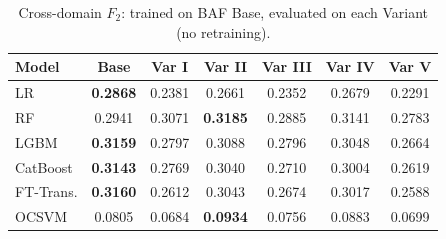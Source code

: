 \begin{table}[ht!]
\centering
\caption{Cross-domain $F_2$: trained on BAF Base, evaluated on each Variant (no retraining).}
\label{tab:crossdomain_f2}
\begin{tabular}{l c c c c c c}
\toprule
Model & Base & Var I & Var II & Var III & Var IV & Var V \\
\midrule
LR         & \textbf{0.2868} & 0.2381 & 0.2661 & 0.2352 & 0.2679 & 0.2291 \\
RF         & 0.2941 & 0.3071 & \textbf{0.3185} & 0.2885 & 0.3141 & 0.2783 \\
LGBM       & \textbf{0.3159} & 0.2797 & 0.3088 & 0.2796 & 0.3048 & 0.2664 \\
CatBoost   & \textbf{0.3143} & 0.2769 & 0.3040 & 0.2710 & 0.3004 & 0.2619 \\
FT-Trans.  & \textbf{0.3160} & 0.2612 & 0.3043 & 0.2674 & 0.3017 & 0.2588 \\
OCSVM      & 0.0805 & 0.0684 & \textbf{0.0934} & 0.0756 & 0.0883 & 0.0699 \\
\bottomrule
\end{tabular}
\end{table}
